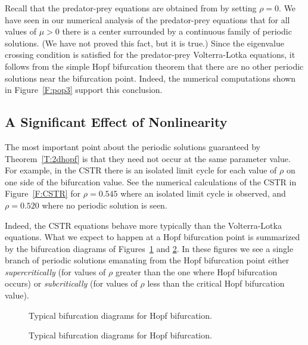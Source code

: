 \documentclass{ximera}
\begin{document}
Recall that the predator-prey equations are obtained from 
by setting $\rho=0$.  We have seen in our numerical analysis of the 
predator-prey equations that for all values of $\mu>0$ there is a center 
surrounded by a continuous family of periodic solutions.  (We 
have not proved this fact, but it is true.)  Since the eigenvalue 
crossing condition is satisfied for the predator-prey Volterra-Lotka 
equations, it follows from the simple Hopf bifurcation theorem that 
there are no other periodic solutions near the bifurcation point. 
  Indeed, the numerical computations 
shown in Figure~\ref{F:pop3} support this conclusion.

\subsection*{A Significant Effect of Nonlinearity}

The most important point about the periodic solutions guaranteed by 
Theorem~\ref{T:2dhopf} is that they need not occur at the same parameter 
value. For example, in the CSTR there is an isolated limit cycle for each 
value of $\rho$ on one side of the bifurcation value.  See the numerical 
calculations of the CSTR in Figure~\ref{F:CSTR} for $\rho=0.545$ where an
isolated limit cycle is observed, and $\rho=0.520$ where no periodic
solution is seen. 

Indeed, the CSTR equations behave more typically than the 
Volterra-Lotka equations.  What we expect to happen at a Hopf bifurcation 
point is summarized by the bifurcation diagrams of Figures~\ref{F:hopf} and 
\ref{F:hopf2}.  In these figures we see a single branch of periodic solutions 
emanating from the Hopf bifurcation point either 
{\em supercritically\/} (for 
values of $\rho$ greater than the one where Hopf bifurcation occurs) or 
{\em subcritically\/} 
(for values of $\rho$ less than the critical Hopf bifurcation value).

\begin{figure}[htb]
           \centerline{%
	   }
           \caption{Typical bifurcation diagrams for Hopf bifurcation.}
           \label{F:hopf}
\end{figure}

\begin{figure}[htb]
           \centerline{%
	   }
           \caption{Typical bifurcation diagrams for Hopf bifurcation.}
           \label{F:hopf2}
\end{figure}
\end{document}
